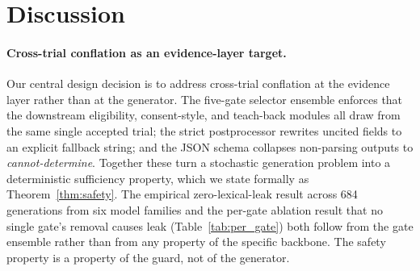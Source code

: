 \documentclass[11pt]{article}
\begin{document}
\section{Discussion}
\label{sec:discussion}

\paragraph{Cross-trial conflation as an evidence-layer target.}
Our central design decision is to address cross-trial conflation at the evidence layer rather than at the generator. The five-gate selector ensemble enforces that the downstream eligibility, consent-style, and teach-back modules all draw from the same single accepted trial; the strict postprocessor rewrites uncited fields to an explicit fallback string; and the JSON schema collapses non-parsing outputs to \emph{cannot-determine}. Together these turn a stochastic generation problem into a deterministic sufficiency property, which we state formally as Theorem~\ref{thm:safety}. The empirical zero-lexical-leak result across 684 generations from six model families and the per-gate ablation result that no single gate's removal causes leak (Table~\ref{tab:per_gate}) both follow from the gate ensemble rather than from any property of the specific backbone. The safety property is a property of the guard, not of the generator.
\end{document}
